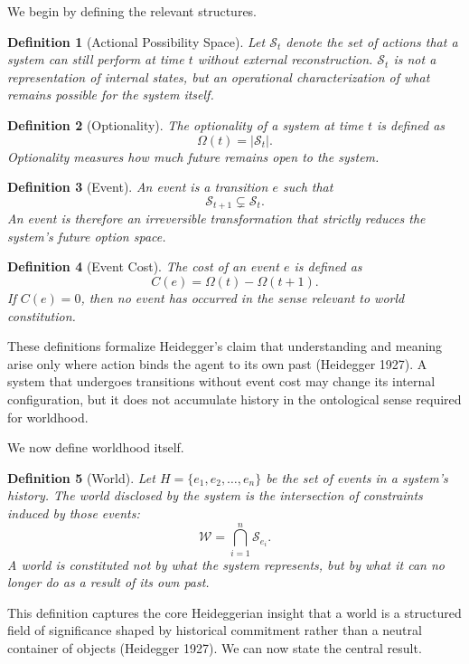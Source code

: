 \documentclass[11pt]{article}
\newtheorem{definition}{Definition}
\theoremstyle{remark}
\begin{document}
We begin by defining the relevant structures.

\begin{definition}[Actional Possibility Space]
Let $\mathcal{S}_t$ denote the set of actions that a system can still perform at time $t$ without external reconstruction. $\mathcal{S}_t$ is not a representation of internal states, but an operational characterization of what remains possible for the system itself.
\end{definition}

\begin{definition}[Optionality]
The optionality of a system at time $t$ is defined as
\[
\Omega(t) = |\mathcal{S}_t|.
\]
Optionality measures how much future remains open to the system.
\end{definition}

\begin{definition}[Event]
An event is a transition $e$ such that
\[
\mathcal{S}_{t+1} \subsetneq \mathcal{S}_t .
\]
An event is therefore an irreversible transformation that strictly reduces the system’s future option space.
\end{definition}

\begin{definition}[Event Cost]
The cost of an event $e$ is defined as
\[
C(e) = \Omega(t) - \Omega(t+1).
\]
If $C(e) = 0$, then no event has occurred in the sense relevant to world constitution.
\end{definition}

These definitions formalize Heidegger’s claim that understanding and meaning arise only where action binds the agent to its own past (Heidegger 1927). A system that undergoes transitions without event cost may change its internal configuration, but it does not accumulate history in the ontological sense required for worldhood.

We now define worldhood itself.

\begin{definition}[World]
Let $H = \{e_1, e_2, \dots, e_n\}$ be the set of events in a system’s history. The world disclosed by the system is the intersection of constraints induced by those events:
\[
\mathcal{W} = \bigcap_{i=1}^{n} \mathcal{S}_{e_i}.
\]
A world is constituted not by what the system represents, but by what it can no longer do as a result of its own past.
\end{definition}

This definition captures the core Heideggerian insight that a world is a structured field of significance shaped by historical commitment rather than a neutral container of objects (Heidegger 1927). We can now state the central result.
\end{document}
